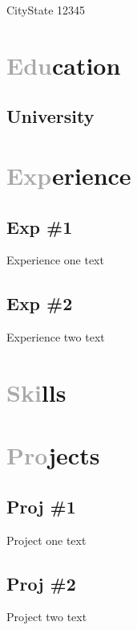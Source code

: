 \documentclass[11pt, a4paper]{coding-resume}
\begin{document}
\address{123 Street}{City}{State 12345}

\newcommand{\sectTitleStyle}{darkgray}

\section{\textcolor{\sectTitleStyle}{Edu}cation}
\subsection{University}
\section{\textcolor{\sectTitleStyle}{Exp}erience}
\subsection{Exp \#1}
Experience one text
\subsection{Exp \#2}
Experience two text
\section{\textcolor{\sectTitleStyle}{Ski}lls}
\section{\textcolor{\sectTitleStyle}{Pro}jects}
\subsection{Proj \#1}
Project one text
\subsection{Proj \#2}
Project two text
\end{document}
